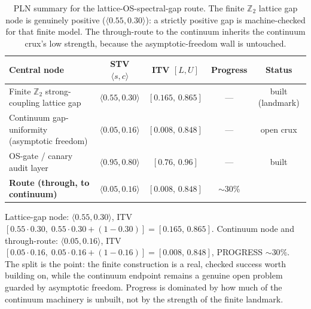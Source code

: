 \begin{table}[h]
\centering
\small
\begin{tabular}{lcccc}
\toprule
Central node & STV $\langle s,c\rangle$ & ITV $[L,U]$ & Progress & Status \\
\midrule
Finite $\mathbb{Z}_2$ strong-coupling lattice gap & $\langle 0.55, 0.30\rangle$ & $[0.165,\,0.865]$ & --- & built (landmark) \\
Continuum gap-uniformity (asymptotic freedom) & $\langle 0.05, 0.16\rangle$ & $[0.008,\,0.848]$ & --- & open crux \\
OS-gate / canary audit layer & $\langle 0.95, 0.80\rangle$ & $[0.76,\,0.96]$ & --- & built \\
\midrule
\textbf{Route (through, to continuum)} & $\langle 0.05, 0.16\rangle$ & $[0.008,\,0.848]$ & $\sim$30\% & \\
\bottomrule
\end{tabular}
\caption{PLN summary for the lattice-OS-spectral-gap route. The finite
$\mathbb{Z}_2$ lattice gap node is genuinely positive
($\langle 0.55,0.30\rangle$): a strictly positive gap is machine-checked for that
finite model. The through-route to the continuum inherits the continuum crux's
low strength, because the asymptotic-freedom wall is untouched.}
\end{table}

\noindent Lattice-gap node: $\langle 0.55, 0.30\rangle$, ITV
$[0.55\cdot 0.30,\;0.55\cdot 0.30+(1-0.30)] = [0.165,\,0.865]$.
Continuum node and through-route: $\langle 0.05, 0.16\rangle$, ITV
$[0.05\cdot 0.16,\;0.05\cdot 0.16+(1-0.16)] = [0.008,\,0.848]$,
PROGRESS $\sim 30\%$. The split is the point: the finite construction is a real,
checked success worth building on, while the continuum endpoint remains a
genuine open problem guarded by asymptotic freedom. Progress is dominated by how
much of the continuum machinery is unbuilt, not by the strength of the finite
landmark.
